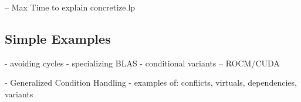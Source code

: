 -- Max
Time to explain concretize.lp

\subsection{Simple Examples}
- avoiding cycles
- specializing BLAS
- conditional variants -- ROCM/CUDA

- Generalized Condition Handling
  - examples of: conflicts, virtuals, dependencies, variants
